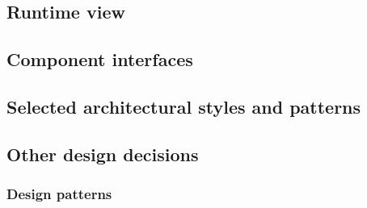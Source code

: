 \subsection{Runtime view}
\subsection{Component interfaces}
\subsection{Selected architectural styles and patterns}
\subsection{Other design decisions}
	\subsubsection{Design patterns}